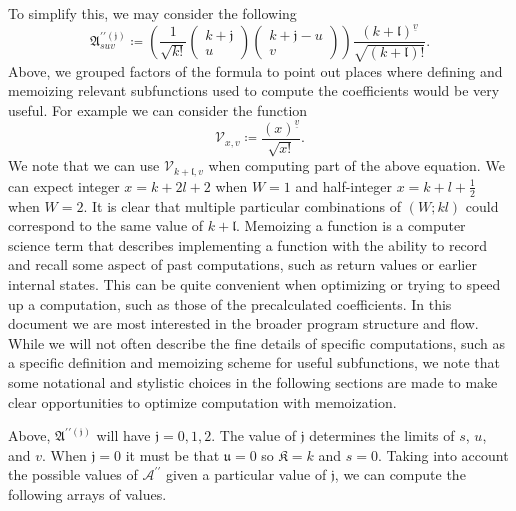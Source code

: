 To simplify this, we may consider the following
\begin{equation}
\mathfrak{A}_{suv}^{\prime\prime\left(\mathfrak{j}\right)}
    \coloneqq
        \left(
            \frac{1}{\sqrt{k!}}
            \begin{pmatrix}k + \mathfrak{j}\\u\end{pmatrix}
            \begin{pmatrix}k + \mathfrak{j} - u\\v\end{pmatrix}
        \right)
        \frac
        {\left(k+\mathfrak{l}\right)^{\underline{v}}}
        {\sqrt{\left(k+\mathfrak{l}\right)!}}
.
\end{equation}
Above, we grouped factors of the formula to point out places where defining and
memoizing relevant subfunctions used to compute the coefficients would be very
useful. For example we can consider the function
\begin{equation}
\mathcal{V}_{x,v}
    \coloneqq
        \frac{\left(x\right)^{\underline{v}}}{\sqrt{x!}}.
\end{equation}
We note that we can use $\mathcal{V}_{k+\mathfrak{l},v}$ when computing part of
the above equation. We can expect integer $x=k+2l+2$ when $W = 1$ and
half-integer $x=k+l+\frac{1}{2}$ when $W = 2$. It is clear that multiple
particular combinations of $\left(W;kl\right)$ could correspond to the same
value of $k + \mathfrak{l}$. Memoizing a function is a computer science term
that describes implementing a function with the ability to record and recall
some aspect of past computations, such as return values or earlier internal
states. This can be quite convenient when optimizing or trying to speed up a
computation, such as those of the precalculated coefficients. In this document
we are most interested in the broader program structure and flow. While we will
not often describe the fine details of specific computations, such as a specific
definition and memoizing scheme for useful subfunctions, we note that some
notational and stylistic choices in the following sections are made to make
clear opportunities to optimize computation with memoization. 

Above, $\mathfrak{A}^{\prime\prime\left(\mathfrak{j}\right)}$ will have
$\mathfrak{j} = 0, 1, 2$. The value of $\mathfrak{j}$ determines the limits of
$s$, $u$, and $v$. When $\mathfrak{j} = 0$ it must be that $\mathfrak{u} = 0$ so
$\mathfrak{K} = k$ and $s = 0$. Taking into account the possible values of
$\mathcal{A}^{\prime\prime}$ given a particular value of $\mathfrak{j}$, we can
compute the following arrays of values. 

